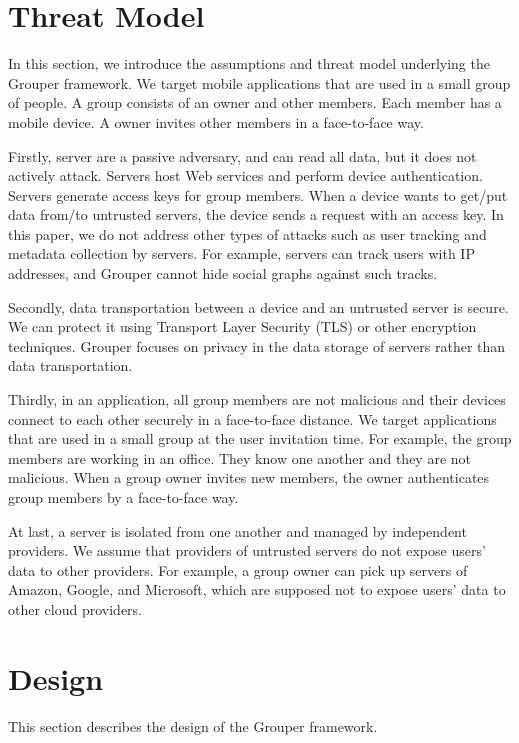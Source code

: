 \documentclass[twocolumn,10pt]{article}
\begin{document}
\section{Threat Model}

In this section, we introduce the assumptions and threat model underlying the Grouper framework.
We target mobile applications that are used in a small group of people.
A group consists of an owner and other members.
Each member has a mobile device.
A owner invites other members in a face-to-face way.

Firstly, server are a passive adversary, and can read all data, but it does not actively attack.
Servers host Web services and perform device authentication.
Servers generate access keys for group members. 
When a device wants to get/put data from/to untrusted servers, the device sends a request with an access key.
In this paper, we do not address other types of attacks such as user tracking and metadata collection by servers. 
For example, servers can track users with IP addresses, and Grouper cannot hide social graphs against such tracks.

Secondly, data transportation between a device and an untrusted server is secure.
We can protect it using Transport Layer Security (TLS) or other encryption techniques.
Grouper focuses on privacy in the data storage of servers rather than data transportation.

Thirdly, in an application, all group members are not malicious and their devices connect to each other securely in a face-to-face distance.
We target applications that are used in a small group at the user invitation time.
For example, the group members are working in an office.
They know one another and they are not malicious.
When a group owner invites new members, the owner authenticates group members by a face-to-face way.

At last, a server is isolated from one another and managed by independent providers.
We assume that providers of untrusted servers do not expose users' data to other providers.
For example, a group owner can pick up servers of Amazon, Google, and Microsoft, which are supposed not to expose users' data to other cloud providers.

\section{Design}

This section describes the design of the Grouper framework.
\end{document}
